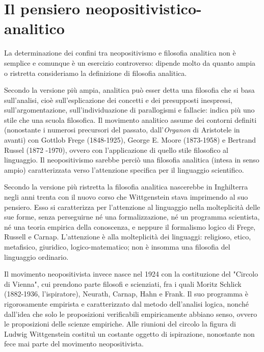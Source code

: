 \chapter{Il pensiero neopositivistico-analitico}
\bigskip
\bigskip
\bigskip

La determinazione dei confini tra neopositivismo
e filosofia analitica non è semplice e comunque
è un esercizio controverso: dipende molto da
quanto ampia o ristretta consideriamo la definizione
di filosofia analitica.

Secondo la versione più ampia, analitica può esser
detta una filosofia che si basa sull'analisi, cioè sull'esplicazione dei concetti e dei
presupposti inespressi, sull'argomentazione, sull'individuazione
di parallogismi e fallacie: indica più uno stile
che una scuola filosofica. Il movimento analitico
assume dei contorni definiti (nonostante i numerosi
precursori del passato, dall'\textit{Organon} di Aristotele in
avanti) con Gottlob Frege (1848-1925), George
E. Moore (1873-1958) e Bertrand Russel (1872 -1970),
ovvero con l'applicazione di quello stile filosofico
al linguaggio. Il neopositivismo sarebbe perciò una
filosofia analitica (intesa in senso ampio) caratterizzata
verso l'attenzione specifica per il linguaggio scientifico.

Secondo la versione più ristretta la filosofia analitica
nascerebbe in Inghilterra negli anni trenta con il nuovo
corso che Wittgenstein stava imprimendo al suo
pensiero. Esso si caratterizza per l'attenzione al
linguaggio nella molteplicità delle sue forme, senza
perseguirne né una formalizzazione, né un programma
scientista, né una teoria empirica della conoscenza, e
neppure il formalismo logico di Frege, Russell e Carnap.
L'attenzione è alla molteplicità dei linguaggi: religioso,
etico, metafisico, giuridico, logico-matematico; non è insomma
una filosofia del linguaggio ordinario.

Il movimento neopositivista invece nasce nel 1924
con la costituzione del "Circolo di Vienna", cui
prendono parte filosofi e scienziati, fra i quali
Moritz Schlick (1882-1936, l'ispiratore), Neurath,
Carnap, Hahn e Frank. Il suo programma è
rigorosamente empirista e caratterizzato dal
metodo dell'analisi logica, nonché dall'idea che
solo le proposizioni verificabili empiricamente
abbiano senso, ovvero le proposizioni delle scienze
empiriche. Alle riunioni del circolo la figura
di Ludwig Wittgenstein costituì un costante
oggetto di ispirazione, nonostante non fece mai
parte del movimento neopositivista.


